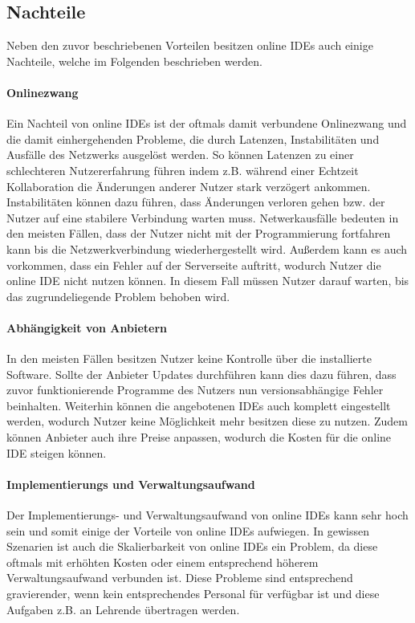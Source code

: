 \subsection{Nachteile}\label{section:stand-der-technik:literaturrecherche:nachteile}

Neben den zuvor beschriebenen Vorteilen besitzen online IDEs auch einige Nachteile, welche im Folgenden beschrieben werden.

\paragraph{Onlinezwang}
Ein Nachteil von online IDEs ist der oftmals damit verbundene Onlinezwang und die damit einhergehenden Probleme, die durch Latenzen, Instabilitäten und Ausfälle des Netzwerks ausgelöst werden. So können Latenzen zu einer schlechteren Nutzererfahrung führen indem z.B. während einer Echtzeit Kollaboration die Änderungen anderer Nutzer stark verzögert ankommen. Instabilitäten können dazu führen, dass Änderungen verloren gehen bzw. der Nutzer auf eine stabilere Verbindung warten muss. Netwerkausfälle bedeuten in den meisten Fällen, dass der Nutzer nicht mit der Programmierung fortfahren kann bis die Netzwerkverbindung wiederhergestellt wird. Außerdem kann es auch vorkommen, dass ein Fehler auf der Serverseite auftritt, wodurch Nutzer die online IDE nicht nutzen können. In diesem Fall müssen Nutzer darauf warten, bis das zugrundeliegende Problem behoben wird.

\paragraph{Abhängigkeit von Anbietern}
In den meisten Fällen besitzen Nutzer keine Kontrolle über die installierte Software. Sollte der Anbieter Updates durchführen kann dies dazu führen, dass zuvor funktionierende Programme des Nutzers nun versionsabhängige Fehler beinhalten. Weiterhin können die angebotenen IDEs auch komplett eingestellt werden, wodurch Nutzer keine Möglichkeit mehr besitzen diese zu nutzen. Zudem können Anbieter auch ihre Preise anpassen, wodurch die Kosten für die online IDE steigen können.

\paragraph{Implementierungs und Verwaltungsaufwand}
Der Implementierungs- und Verwaltungsaufwand von online IDEs kann sehr hoch sein \cite{malan_standardizing_2022} und somit einige der Vorteile von online IDEs aufwiegen. In gewissen Szenarien ist auch die Skalierbarkeit von online IDEs ein Problem, da diese oftmals mit erhöhten Kosten oder einem entsprechend höherem Verwaltungsaufwand verbunden ist. Diese Probleme sind entsprechend gravierender, wenn kein entsprechendes Personal für verfügbar ist und diese Aufgaben z.B. an Lehrende übertragen werden.

